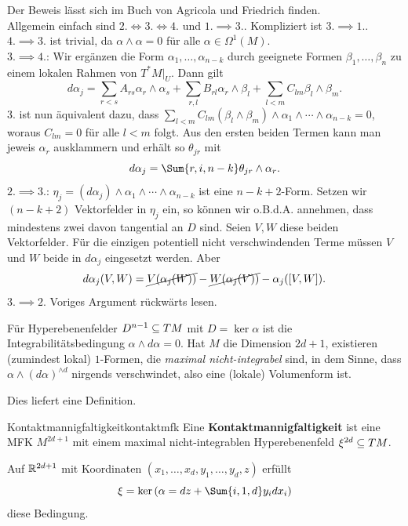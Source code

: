 \begin{beweis}
Der Beweis lässt sich im Buch von Agricola und Friedrich finden.\\
Allgemein einfach sind $2. \iff 3. \iff 4.$ und $1. \implies 3.$. Kompliziert ist $3. \implies 1.$.\\
$4. \implies 3.$ ist trivial, da $\alpha \wedge \alpha = 0$ für alle $\alpha \in \Omega^1(M)$.\\
$3. \implies 4.$: Wir ergänzen die Form $\alpha_1, \dots, \alpha_{n-k}$ durch geeignete Formen $\beta_1, \dots, \beta_n$ zu einem lokalen Rahmen von $T^\ast M|_U$. Dann gilt
\begin{equation}
d\alpha_j = \sum_{r < s} A_{rs} \alpha_{r} \wedge \alpha_s + \sum_{r,l} B_{rl} \alpha_r \wedge \beta_l + \sum_{l < m} C_{lm} \beta_l \wedge \beta_m.
\end{equation}
$3.$ ist nun äquivalent dazu, dass $\sum_{l < m} C_{lm} (\beta_l \wedge \beta_m) \wedge \alpha_1 \wedge \cdots \wedge \alpha_{n-k} = 0$, woraus $C_{lm} = 0$ für alle $l < m$ folgt. Aus den ersten beiden Termen kann man jeweis $\alpha_r$ ausklammern und erhält so $\theta_{jr}$ mit 
\begin{equation}
d \alpha_j = \Sum{r, i, n-k} \theta_{jr} \wedge \alpha_r.
\end{equation}
$2. \implies 3.$: $\eta_j = (d \alpha_j) \wedge \alpha_1 \wedge \cdots \wedge \alpha_{n-k}$ ist eine $n-k+2$-Form. Setzen wir $(n-k+2)$ Vektorfelder in $\eta_j$ ein, so können wir o.B.d.A. annehmen, dass mindestens zwei davon tangential an $D$ sind. Seien $V, W$ diese beiden Vektorfelder. Für die einzigen potentiell nicht verschwindenden Terme müssen $V$ und $W$ beide in $d \alpha_j$ eingesetzt werden. Aber 
\begin{equation}
d \alpha_j (V,W) = \cancel{V( \alpha_j (W))} - \cancel{W(\alpha_j (V))} - \alpha_j ([V,W]).
\end{equation}
$3. \implies 2.$ Voriges Argument rückwärts lesen.
\end{beweis}
\begin{bemerkung}
Für Hyperebenenfelder $D^{n-1} \subseteq TM$ mit $D = \ker \alpha$ ist die Integrabilitätsbedingung $\alpha \wedge d\alpha = 0$. Hat $M$ die Dimension $2d+1$, existieren (zumindest lokal) $1$-Formen, die \textit{maximal nicht-integrabel} sind, in dem Sinne, dass $\alpha \wedge (d\alpha)^{\wedge d}$ nirgends verschwindet, also eine (lokale) Volumenform ist.
\end{bemerkung}
Dies liefert eine Definition.
\begin{definition}{Kontaktmannigfaltigkeit}{kontaktmfk}
Eine \textbf{Kontaktmannigfaltigkeit} ist eine MFK $M^{2d+1}$ mit einem maximal nicht-integrablen Hyperebenenfeld $\xi^{2d} \subseteq TM$.
\end{definition}
\begin{beispiel}
Auf $\mathbb{R}^{2d+1}$ mit Koordinaten $(x_1, \dots, x_d, y_1, \dots, y_d, z)$ erfüllt
\begin{equation}
\xi = \ker \left(\alpha = dz + \Sum{i,1,d} y_i dx_i \right)
\end{equation}
diese Bedingung.
\end{beispiel}
